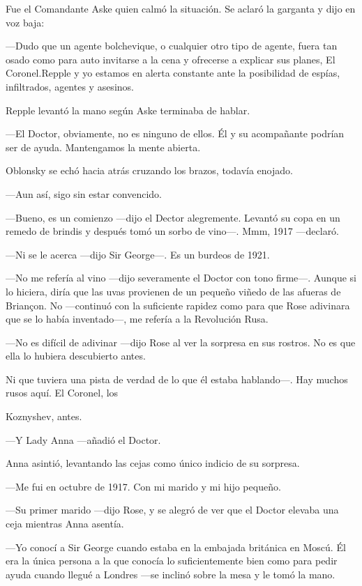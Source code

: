 {Fue el Comandante Aske quien calmó la situación. Se aclaró la garganta
y dijo en voz baja:}

{---Dudo que un agente bolchevique, o cualquier otro tipo de agente,
	fuera tan osado como para auto invitarse a la cena y ofrecerse a
	explicar sus planes, El Coronel.Repple y yo estamos en alerta constante
ante la posibilidad de espías, infiltrados, agentes y asesinos.}

{Repple levantó la mano según Aske terminaba de hablar.}

{---El Doctor, obviamente, no es ninguno de ellos. Él y su acompañante
podrían ser de ayuda. Mantengamos la mente abierta.}

{Oblonsky se echó hacia atrás cruzando los brazos, todavía enojado.}

{---Aun así, sigo sin estar convencido.}

{---Bueno, es un comienzo ---dijo el Dector alegremente. Levantó su copa
	en un remedo de brindis y después tomó un sorbo de vino---. Mmm, 1917
---declaró.}

{---Ni se le acerca ---dijo Sir George---. Es un burdeos de 1921.}

{---No me refería al vino ---dijo severamente el Doctor con tono
	firme---. Aunque si lo hiciera, diría que las uvas provienen de un
	pequeño viñedo de las afueras de Briançon. No ---continuó con la
	suficiente rapidez como para que Rose adivinara que se lo había
inventado---, me refería a la Revolución Rusa.}

{---No es difícil de adivinar ---dijo Rose al ver la sorpresa en sus
rostros. No es que ella lo hubiera descubierto antes.}

{Ni que tuviera una pista de verdad de lo que él estaba hablando---. Hay
muchos rusos aquí. El Coronel, los}

{Koznyshev, antes.}

{---Y Lady Anna ---añadió el Doctor.}

{Anna asintió, levantando las cejas como único indicio de su sorpresa.}

{---Me fui en octubre de 1917. Con mi marido y mi hijo pequeño.}

{---Su primer marido ---dijo Rose, y se alegró de ver que el Doctor
elevaba una ceja mientras Anna asentía.}

{---Yo conocí a Sir George cuando estaba en la embajada británica en
	Moscú. Él era la única persona a la que conocía lo suficientemente bien
	como para pedir ayuda cuando llegué a Londres ---se inclinó sobre la
mesa y le tomó la mano.}

